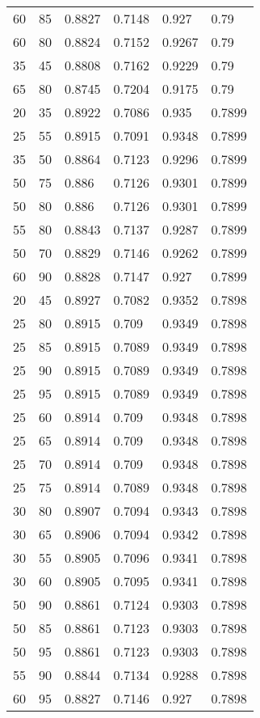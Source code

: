 \begin{center}
\begin{longtable}{|l|l|l|l|l|l|}
60 & 85 & 0.8827 & 0.7148 & 0.927  & 0.79   \\
60 & 80 & 0.8824 & 0.7152 & 0.9267 & 0.79   \\
35 & 45 & 0.8808 & 0.7162 & 0.9229 & 0.79   \\
65 & 80 & 0.8745 & 0.7204 & 0.9175 & 0.79   \\
20 & 35 & 0.8922 & 0.7086 & 0.935  & 0.7899 \\
25 & 55 & 0.8915 & 0.7091 & 0.9348 & 0.7899 \\
35 & 50 & 0.8864 & 0.7123 & 0.9296 & 0.7899 \\
50 & 75 & 0.886  & 0.7126 & 0.9301 & 0.7899 \\
50 & 80 & 0.886  & 0.7126 & 0.9301 & 0.7899 \\
55 & 80 & 0.8843 & 0.7137 & 0.9287 & 0.7899 \\
50 & 70 & 0.8829 & 0.7146 & 0.9262 & 0.7899 \\
60 & 90 & 0.8828 & 0.7147 & 0.927  & 0.7899 \\
20 & 45 & 0.8927 & 0.7082 & 0.9352 & 0.7898 \\
25 & 80 & 0.8915 & 0.709  & 0.9349 & 0.7898 \\
25 & 85 & 0.8915 & 0.7089 & 0.9349 & 0.7898 \\
25 & 90 & 0.8915 & 0.7089 & 0.9349 & 0.7898 \\
25 & 95 & 0.8915 & 0.7089 & 0.9349 & 0.7898 \\
25 & 60 & 0.8914 & 0.709  & 0.9348 & 0.7898 \\
25 & 65 & 0.8914 & 0.709  & 0.9348 & 0.7898 \\
25 & 70 & 0.8914 & 0.709  & 0.9348 & 0.7898 \\
25 & 75 & 0.8914 & 0.7089 & 0.9348 & 0.7898 \\
30 & 80 & 0.8907 & 0.7094 & 0.9343 & 0.7898 \\
30 & 65 & 0.8906 & 0.7094 & 0.9342 & 0.7898 \\
30 & 55 & 0.8905 & 0.7096 & 0.9341 & 0.7898 \\
30 & 60 & 0.8905 & 0.7095 & 0.9341 & 0.7898 \\
50 & 90 & 0.8861 & 0.7124 & 0.9303 & 0.7898 \\
50 & 85 & 0.8861 & 0.7123 & 0.9303 & 0.7898 \\
50 & 95 & 0.8861 & 0.7123 & 0.9303 & 0.7898 \\
55 & 90 & 0.8844 & 0.7134 & 0.9288 & 0.7898 \\
60 & 95 & 0.8827 & 0.7146 & 0.927  & 0.7898 \\

\end{longtable}
\end{center}
